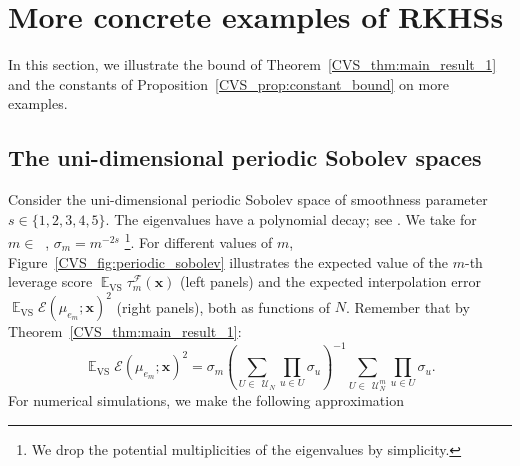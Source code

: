 \documentclass[twoside,11pt]{book}
\numberwithin{theorem}{chapter}
\numberwithin{definition}{chapter}
\numberwithin{proposition}{chapter}
\numberwithin{corollary}{chapter}
\numberwithin{example}{chapter}
\numberwithin{lemma}{chapter}
\numberwithin{assumption}{chapter}
\DeclareMathOperator{\VS}{\mathrm{VS}}
\DeclareMathOperator{\EX}{\mathbb{E}}
\DeclareMathOperator{\F}{\mathcal{F}}
\DeclareMathOperator{\X}{\mathcal{X}}
\DeclareMathOperator{\Ns}{\mathbb{N}^{*}}
\def\UN{\:\mathcal{U}_N}
\def\UNm{\:\mathcal{U}_N^m}
\begin{document}
%
\section{More concrete examples of RKHSs}
In this section, we illustrate the bound of Theorem~\ref{CVS_thm:main_result_1} and the constants of Proposition~\ref{CVS_prop:constant_bound} on more examples.
\subsection{The uni-dimensional periodic Sobolev spaces}

Consider the uni-dimensional periodic Sobolev space of smoothness parameter $s \in \{1,2,3,4,5\}$.
The eigenvalues have a polynomial decay; see \citep{Wah90}. We take for $m \in \Ns$, $\sigma_{m}=m^{-2s}$ \footnote{We drop the potential multiplicities of the eigenvalues by simplicity.}.
For different values of $m$, Figure~\ref{CVS_fig:periodic_sobolev} illustrates the expected value of the $m$-th leverage score $\EX_{\VS} \tau_{m}^{\F}(\bm{x})$ (left panels) and the expected interpolation error $\EX_{\VS} \mathcal{E}(\mu_{e_{m}};\bm{x})^{2}$ (right panels), both as functions of $N$.
Remember that by Theorem~\ref{CVS_thm:main_result_1}:
\begin{equation}
\EX_{\VS} \mathcal{E}(\mu_{e_{m}};\bm{x})^{2} = \sigma_{m} \left(\sum\limits_{ U \in \: \UN} \prod\limits_{u \in U} \sigma_{u} \right)^{-1}  \sum\limits_{U \in \: \UNm} \prod\limits_{u \in U} \sigma_{u}.
\end{equation}
For numerical simulations, we make the following approximation
\end{document}

